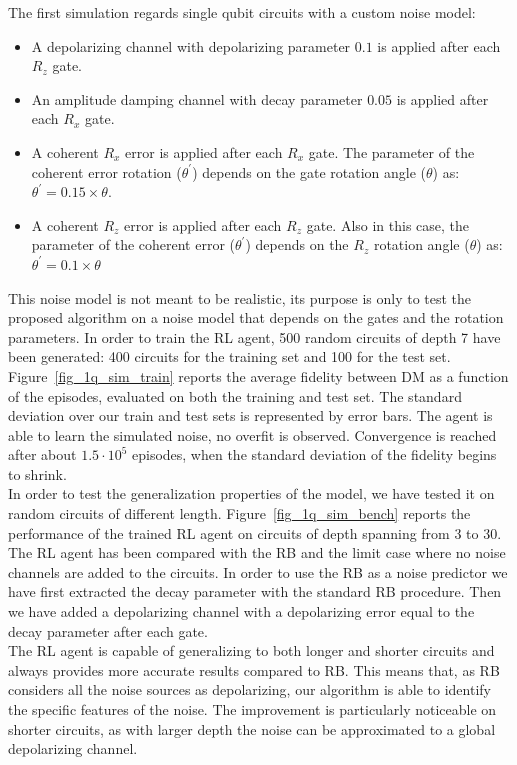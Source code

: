 \documentclass[referee,sn-basic]{sn-jnl} %
\begin{document}
The first simulation regards single qubit circuits with a custom noise model:
\begin{itemize}
    \item A depolarizing channel with depolarizing parameter $0.1$ is applied after each $R_z$ gate.
    \item An amplitude damping channel with decay parameter $0.05$ is applied after each $R_x$ gate.
    \item A coherent $R_x$ error is applied after each $R_x$ gate. The parameter of the coherent error rotation ($\theta^{'}$) depends on the gate rotation angle ($\theta$) as: $\theta^{'}=0.15\times\theta$.
    \item A coherent $R_z$ error is applied after each $R_z$ gate. Also in this case, the parameter of the coherent error ($\theta^{'}$) depends on the $R_z$ rotation angle ($\theta$) as: $\theta^{'}=0.1\times\theta$
\end{itemize}
This noise model is not meant to be realistic, its purpose is only to test the proposed algorithm on a noise model that depends on the gates and the rotation parameters. In order to train the RL agent, 500 random circuits of depth 7 have been generated: 400 circuits for the training set and 100 for the test set. Figure~\ref{fig_1q_sim_train} reports the average fidelity between DM as a function of the episodes, evaluated on both the training and test set.
The standard deviation over our train and test sets is represented by error bars. The agent is able to learn the simulated noise, no overfit is observed. Convergence is reached after about $1.5\cdot10^5$ episodes, when the standard deviation of the fidelity begins to shrink.\\

\noindent
In order to test the generalization properties of the model, we have tested it on random circuits of different length. Figure~\ref{fig_1q_sim_bench} reports the performance of the trained RL agent on circuits of depth spanning from 3 to 30. The RL agent has been compared with the RB and the limit case where no noise channels are added to the circuits. In order to use the RB as a noise predictor we have first extracted the decay parameter with the standard RB procedure. Then we have added a depolarizing channel with a depolarizing error equal to the decay parameter after each gate.\\
The RL agent is capable of generalizing to both longer and shorter circuits and always provides more accurate results compared to RB. This means that, as RB considers all the noise sources as depolarizing, our algorithm is able to identify the specific features of the noise. The improvement is particularly noticeable on shorter circuits, as with larger depth the noise can be approximated to a global depolarizing channel.\\
\end{document}

